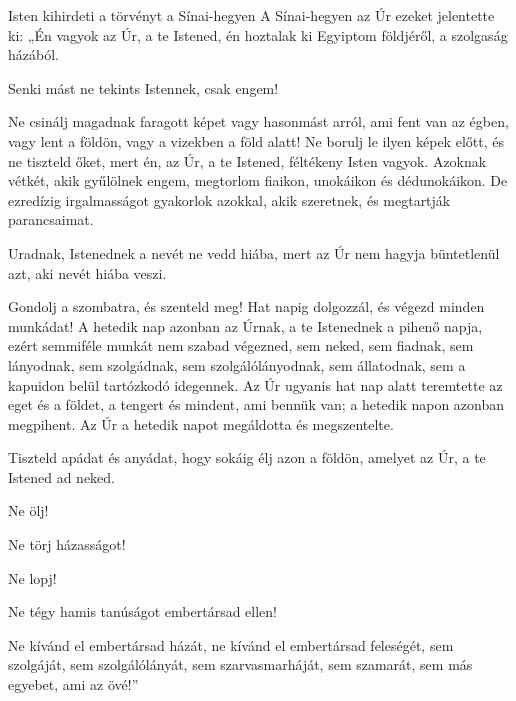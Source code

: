 \documentclass[twoside]{article}
\begin{document}
\begin{lectio}{Isten kihirdeti a törvényt a Sínai-hegyen}
\noindent A Sínai-hegyen az Úr ezeket jelentette ki: „Én vagyok az Úr, a te Istened, én hoztalak %
ki Egyiptom földjéről, a szolgaság házából.

Senki mást ne tekints Istennek, csak engem!

Ne csinálj magadnak faragott képet vagy hasonmást arról, ami fent van az égben, vagy lent a %
földön, vagy a vizekben a föld alatt! Ne borulj le ilyen képek előtt, és ne tiszteld őket, mert én, az Úr, a te Istened, féltékeny Isten vagyok. Azoknak vétkét, akik gyűlölnek engem, megtorlom fiaikon, unokáikon és dédunokáikon. De ezredízig irgalmasságot gyakorlok azokkal, akik szeretnek, és megtartják parancsaimat.

Uradnak, Istenednek a nevét ne vedd hiába, mert az Úr nem hagyja büntetlenül azt, aki nevét hiába %
veszi.

Gondolj a szombatra, és szenteld meg! Hat napig dolgozzál, és végezd minden munkádat! A hetedik %
nap azonban az Úrnak, a te Istenednek a pihenő napja, ezért semmiféle munkát nem szabad végezned, sem neked, sem fiadnak, sem lányodnak, sem szolgádnak, sem szolgálólányodnak, sem állatodnak, sem a kapuidon belül tartózkodó idegennek. Az Úr ugyanis hat nap alatt teremtette az eget és a földet, a tengert és mindent, ami bennük van; a hetedik napon azonban megpihent. Az Úr a hetedik napot megáldotta és megszentelte.

Tiszteld apádat és anyádat, hogy sokáig élj azon a földön, amelyet az Úr, a te Istened ad neked.

Ne ölj!

Ne törj házasságot!

Ne lopj!

Ne tégy hamis tanúságot embertársad ellen!

Ne kívánd el embertársad házát, ne kívánd el embertársad feleségét, sem szolgáját, sem %
szolgálólányát, sem szarvasmarháját, sem szamarát, sem más egyebet, ami az övé!”
\end{lectio}


\end{document}
